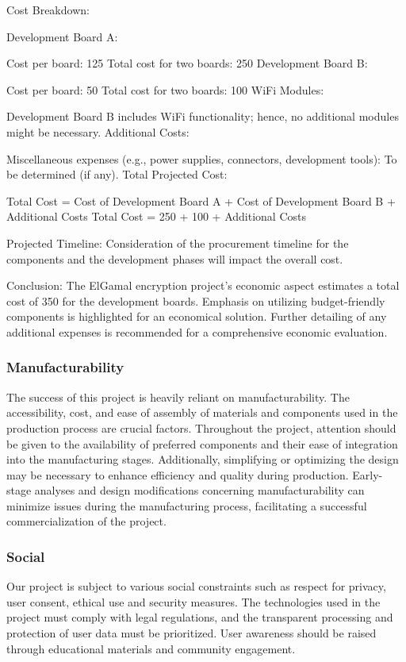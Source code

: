 \documentclass[12pt]{article}
\begin{document}
		Cost Breakdown:
		
		Development Board A:
		
		Cost per board: 125
		Total cost for two boards: 250
		Development Board B:
		
		Cost per board: 50
		Total cost for two boards: 100
		WiFi Modules:
		
		Development Board B includes WiFi functionality; hence, no additional modules might be necessary.
		Additional Costs:
		
		Miscellaneous expenses (e.g., power supplies, connectors, development tools): To be determined (if any).
		Total Projected Cost:
		
		Total Cost = Cost of Development Board A + Cost of Development Board B + Additional Costs
		Total Cost = 250 + 100 + Additional Costs
		
		Projected Timeline:
		Consideration of the procurement timeline for the components and the development phases will impact the overall cost.
		
		Conclusion:
		The ElGamal encryption project's economic aspect estimates a total cost of 350 for the development boards. Emphasis on utilizing budget-friendly components is highlighted for an economical solution. Further detailing of any additional expenses is recommended for a comprehensive economic evaluation.
		\subsubsection{Manufacturability}
		The success of this project is heavily reliant on manufacturability. The accessibility, cost, and ease of assembly of materials and components used in the production process are crucial factors. Throughout the project, attention should be given to the availability of preferred components and their ease of integration into the manufacturing stages. Additionally, simplifying or optimizing the design may be necessary to enhance efficiency and quality during production. Early-stage analyses and design modifications concerning manufacturability can minimize issues during the manufacturing process, facilitating a successful commercialization of the project.
		\subsubsection{Social}
  		Our project is subject to various social constraints such as respect for privacy, user consent, ethical use and security measures. The technologies used in the project must comply with legal regulations, and the transparent processing and protection of user data must be prioritized. User awareness should be raised through educational materials and community engagement.
\end{document}
